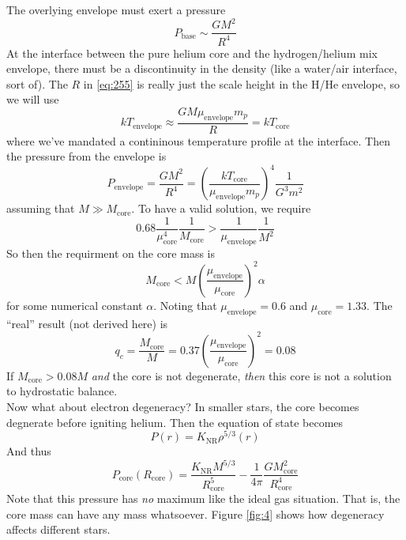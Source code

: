 \documentclass[10pt]{article}
\numberwithin{equation}{section}
\newcommand{\n}{\noindent}
\newcommand{\figref}[1]{Figure \ref{#1}}
\begin{document}
    The overlying envelope must exert a pressure
    \begin{equation}
      \label{eq:255}
      P_{\mathrm{base}}\sim\frac{GM^2}{R^4}
    \end{equation}
    At the interface between the pure helium core and the
    hydrogen/helium mix envelope, there must be a discontinuity in the
    density (like a water/air interface, sort of). The $R$ in
    \eqref{eq:255} is really just the scale height in the H/He
    envelope, so we will use
    \begin{equation}
      \label{eq:256}
      kT_{\mathrm{envelope}}\approx\frac{GM\mu_{\mathrm{envelope}}m_p}{R}
=kT_{\mathrm{core}}
    \end{equation}
    where we've mandated a contininous temperature profile at the
    interface. Then the pressure from the envelope is
    \begin{equation}
      \label{eq:257}
      P_{\mathrm{envelope}}=\frac{GM^2}{R^4}=\left(\frac{kT_{\mathrm
{core}}}{\mu_{\mathrm{envelope}}m_p}\right)^4\frac{1}{G^3m^2}
    \end{equation}
    assuming that $M\gg M_{\mathrm{core}}$. To have a valid solution,
    we require
    \begin{equation}
      \label{eq:258}
      0.68\frac{1}{\mu_{\mathrm{core}}^4}\frac{1}{M_{\mathrm{core}}}>\frac
{1}{\mu_{\mathrm{envelope}}}\frac{1}{M^2}
    \end{equation}
    So then the requirment on the core mass is
    \begin{equation}
      \label{eq:259}
      M_{\mathrm{core}}<M\left(\frac{\mu_{\mathrm{envelope}}}{\mu_{\mathrm
{core}}}\right)^2\alpha
    \end{equation}
    for some numerical constant $\alpha$. Noting that
    $\mu_{\mathrm{envelope}}=0.6$ and $\mu_{\mathrm{core}}=1.33$. The
    ``real'' result (not derived here) is
    \begin{equation}
      \label{eq:260}
      q_c=\frac{M_{\mathrm{core}}}{M}=0.37\left(\frac{\mu_{\mathrm
{envelope}}}{\mu_{\mathrm{core}}}\right)^2=0.08
    \end{equation}
    If $M_{\mathrm{core}}>0.08M$ \emph{and} the core is not
    degenerate, \emph{then} this core is not a solution to hydrostatic
    balance.\\

    \n Now what about electron degeneracy? In smaller stars, the core
    becomes degnerate before igniting helium. Then the equation of
    state becomes
    \begin{equation}
      \label{eq:261}
      P(r)=K_{\mathrm{NR}}\rho^{5/3}(r)
    \end{equation}
    And thus
    \begin{equation}
      \label{eq:262}
      P_{\mathrm{core}}(R_{\mathrm{core}})=\frac{K_{\mathrm{NR}}M^{5/3}}{R_
{\mathrm{core}}^5}-\frac{1}{4\pi}\frac{GM_{\mathrm{core}}^2}{R_{\mathrm
{core}}^4}
    \end{equation}
    Note that this pressure has \emph{no} maximum like the ideal gas
    situation. That is, the core mass can have any mass
    whatsoever. \figref{fig:4} shows how degeneracy affects different
    stars.\\
\end{document}
